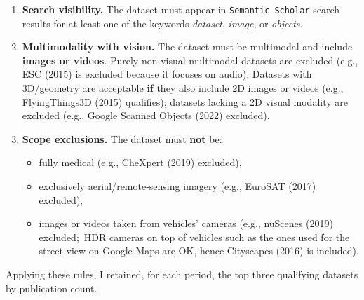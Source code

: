 \documentclass{article}
\begin{document}
\begin{enumerate}
  \item \textbf{Search visibility.} The dataset must appear in \texttt{Semantic Scholar} search results for at least one of the keywords \emph{dataset}, \emph{image}, or \emph{objects}.
  \item \textbf{Multimodality with vision.} The dataset must be multimodal and include \textbf{images or videos}. Purely non-visual multimodal datasets are excluded (e.g., ESC (2015) is excluded because it focuses on audio). Datasets with 3D/geometry are acceptable \textbf{if} they also include 2D images or videos (e.g., FlyingThings3D (2015) qualifies); datasets lacking a 2D visual modality are excluded (e.g., Google Scanned Objects (2022) excluded).
  \item \textbf{Scope exclusions.} The dataset must \textbf{not} be:
    \begin{itemize}
      \item fully medical (e.g., CheXpert (2019) excluded),
      \item exclusively aerial/remote-sensing imagery (e.g., EuroSAT (2017) excluded),
      \item images or videos taken from vehicles' cameras (e.g., nuScenes (2019) excluded;\, HDR cameras on top of vehicles such as the ones used for the street view on Google Maps are OK, hence Cityscapes (2016) is included).
    \end{itemize}
\end{enumerate}

Applying these rules, I retained, for each period, the top three qualifying datasets by publication count.
\end{document}

